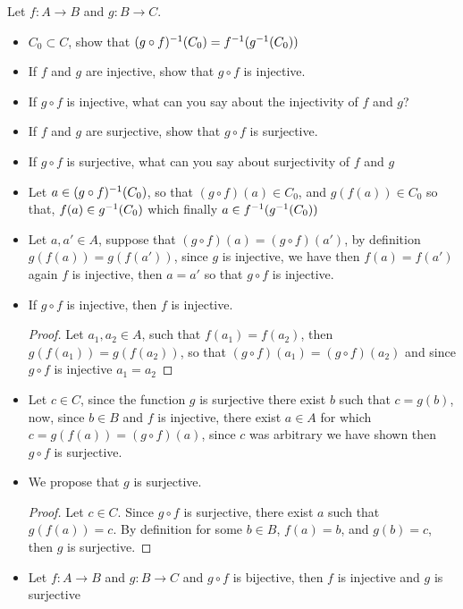 \begin{exc}
	Let $ f: A \rightarrow B $ and $ g: B \rightarrow C $.
	\begin{itemize}
		\item $ C_0 \subset C $, show that $ (g \circ f)^{-1} (C_0) = f^{-1}(g^{-1}(C_0)) $
		\item If $ f $ and $ g $ are injective, show that $ g \circ f $ is injective.
		\item If $ g \circ f $ is injective, what can you say about the injectivity of $ f $ and $ g $?
		\item If $ f $ and $ g $ are surjective, show that $ g \circ f $ is surjective.
		\item If $ g \circ f $ is surjective, what can you say about surjectivity of $ f $ and $ g $
	\end{itemize}
\end{exc}
\begin{sol}
\begin{itemize}
		\item Let $ a \in (g \circ f)^{-1} (C_0) $, so that $ (g \circ f)(a) \in C_0 $, and $ g(f(a)) \in C_0 $ so that, $ f(a) \in g^{-1}(C_0) $ which finally $ a \in f^{-1}(g^{-1}(C_0)) $
	\item Let $ a,a' \in A $, suppose that $ (g \circ f)(a) = (g \circ f)(a') $, by definition $ g(f(a)) = g(f(a')) $, since $ g $ is injective, we have then $ f(a) = f(a') $ again $ f $ is injective, then $ a = a' $ so that $ g \circ f $ is injective.
	\item If $ g \circ f $ is injective, then $ f $ is injective.
	\begin{proof}
		Let $ a_1, a_2 \in A $, such that $ f(a_1) = f(a_2) $, then $ g(f(a_1)) = g(f(a_2)) $, so that $ (g \circ f)(a_1) = (g \circ f)(a_2) $ and since $ g \circ f $ is injective $ a_1 = a_2 $
	\end{proof}
	\item Let $ c \in C $, since the function $ g $ is surjective there exist $ b $ such that $ c = g(b) $, now, since $ b \in B $ and $ f $ is injective, there exist $ a \in A $ for which $ c = g(f(a)) = (g \circ f)(a) $, since $ c $ was arbitrary we have shown then $ g \circ f $ is surjective.
	\item We propose that $ g $ is surjective.
	\begin{proof}
		Let $ c \in C $. Since $ g \circ f $ is surjective, there exist $ a $ such that $ g(f(a)) = c $. By definition for some $ b \in B $, $ f(a) = b $, and $ g(b) = c $, then $ g $ is surjective.
	\end{proof}
	\item
	\begin{thm}
		Let $ f: A \rightarrow B $ and $ g: B \rightarrow C $ and $ g \circ f $ is bijective, then $ f $ is injective and $ g $ is surjective	
	\end{thm}
\end{itemize}
\end{sol}